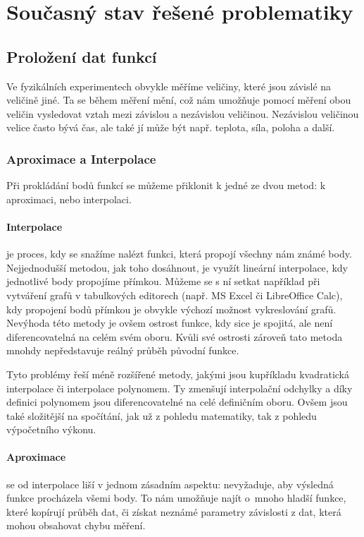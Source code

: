 \newcommand{\nsum}{\sum^n_{i=1}}
\newcommand{\nsumx}{\sum^n_{i=1}x_i}
\newcommand{\nsumy}{\sum^n_{i=1}y_i}
\newcommand{\nsumxx}{\sum^n_{i=1}x_i^2}
\newcommand{\nsumxy}{\sum^n_{i=1}x_iy_i}

\section{Současný stav řešené problematiky}
\subsection{Proložení dat funkcí}
Ve fyzikálních experimentech obvykle měříme veličiny, které jsou závislé na
veličině jiné. Ta se během měření mění, což nám umožňuje pomocí měření obou
veličin vysledovat vztah mezi závislou a nezávislou veličinou. Nezávislou
veličinou velice často bývá čas, ale také jí může být např. teplota, síla,
poloha a další.\cite{praktikum}


\subsubsection{Aproximace a Interpolace}
Při prokládání bodů funkcí se můžeme přiklonit k jedné ze dvou metod: k
aproximaci, nebo interpolaci.

\paragraph{Interpolace} je proces, kdy se snažíme nalézt funkci, která propojí
všechny nám známé body. Nejjednodušší metodou, jak toho dosáhnout, je využít
lineární interpolace, kdy jednotlivé body propojíme přímkou. Můžeme se s ní
setkat například při vytváření grafů v tabulkových editorech (např. MS Excel či
LibreOffice Calc), kdy propojení bodů přímkou je obvykle výchozí možnost
vykreslování grafů. Nevýhoda této metody je ovšem ostrost funkce, kdy sice je
spojitá, ale není diferencovatelná na celém svém oboru. Kvůli své ostrosti
zároveň tato metoda mnohdy nepředstavuje reálný průběh původní funkce.

Tyto problémy řeší méně rozšířené metody, jakými jsou kupříkladu kvadratická
interpolace či interpolace polynomem. Ty zmenšují interpolační odchylky a díky
definici polynomem jsou diferencovatelné na celé definičním oboru. Ovšem jsou
také složitější na spočítání, jak už z pohledu matematiky, tak z pohledu
výpočetního výkonu.

\paragraph{Aproximace} se od interpolace liší v jednom zásadním aspektu:
nevyžaduje, aby výsledná funkce procházela všemi body. To nám umožňuje najít
o~mnoho hladší funkce, které kopírují průběh dat, či získat neznámé parametry
závislosti z dat, která mohou obsahovat chybu měření. 

